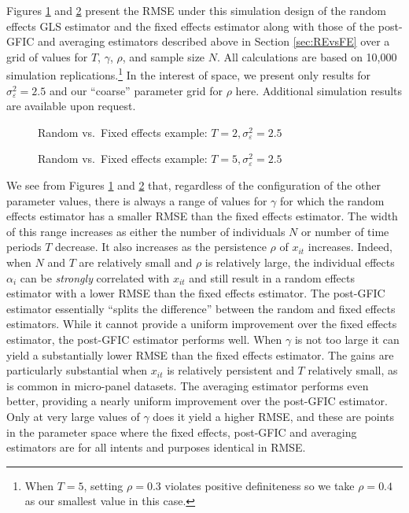 Figures \ref{fig:REvsFE_T2} and \ref{fig:REvsFE_T5} present the RMSE under this simulation design of the random effects GLS estimator and the fixed effects estimator along with those of the post-GFIC and averaging estimators described above in Section \ref{sec:REvsFE} over a grid of values for $T$, $\gamma$, $\rho$, and sample size $N$.
All calculations are based on 10,000 simulation replications.\footnote{When $T=5$, setting $\rho = 0.3$ violates positive definiteness so we take $\rho=0.4$ as our smallest value in this case.} In the interest of space, we present only results for $\sigma_{\varepsilon}^2 = 2.5$ and our ``coarse'' parameter grid for $\rho$ here. 
Additional simulation results are available upon request.
 

\begin{figure}[h]
  \centering
  
  \caption{Random vs.\ Fixed effects example: $T=2, \sigma_{\varepsilon}^2 = 2.5$}
  \label{fig:REvsFE_T2}
\end{figure}

\begin{figure}[h]
  \centering
  
  \caption{Random vs.\ Fixed effects example: $T=5, \sigma_{\varepsilon}^2 = 2.5$}
  \label{fig:REvsFE_T5}
\end{figure}

We see from Figures \ref{fig:REvsFE_T2} and \ref{fig:REvsFE_T5} that, regardless of the configuration of the other parameter values, there is always a range of values for $\gamma$ for which the random effects estimator has a smaller RMSE than the fixed effects estimator.
The width of this range increases as either the number of individuals $N$ or number of time periods $T$ decrease.
It also increases as the persistence $\rho$ of $x_{it}$ increases.
Indeed, when $N$ and $T$ are relatively small and $\rho$ is relatively large, the individual effects $\alpha_{i}$ can be \emph{strongly} correlated with $x_{it}$ and still result in a random effects estimator with a lower RMSE than the fixed effects estimator. 
The post-GFIC estimator essentially ``splits the difference'' between the random and fixed effects estimators.
While it cannot provide a uniform improvement over the fixed effects estimator, the post-GFIC estimator performs well.
When $\gamma$ is not too large it can yield a substantially lower RMSE than the fixed effects estimator.
The gains are particularly substantial when $x_{it}$ is relatively persistent and $T$ relatively small, as is common in micro-panel datasets.
The averaging estimator performs even better, providing a nearly uniform improvement over the post-GFIC estimator.
Only at very large values of $\gamma$ does it yield a higher RMSE, and these are points in the parameter space where the fixed effects, post-GFIC and averaging estimators are for all intents and purposes identical in RMSE.

